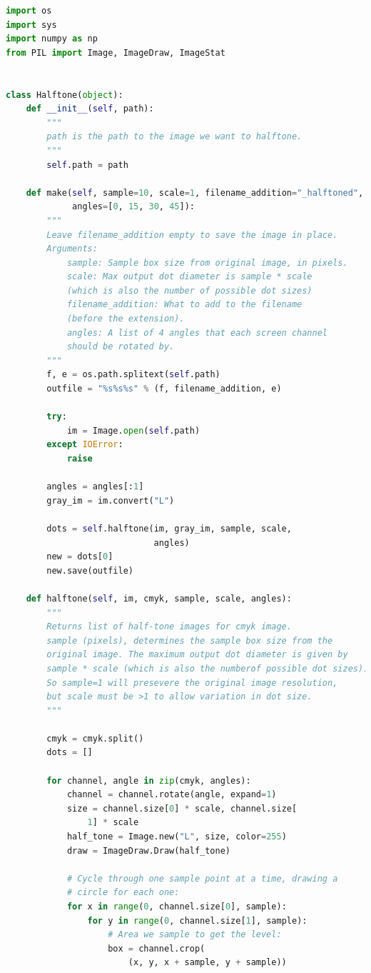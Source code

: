 \documentclass[%
]{USN-MSc}
\begin{document}
\begin{lstlisting}[language=Python, caption=Gray-scale Halftone., label={lst:Gray-scale Halftone}]
import os
import sys
import numpy as np
from PIL import Image, ImageDraw, ImageStat


class Halftone(object):
    def __init__(self, path):
        """
        path is the path to the image we want to halftone.
        """
        self.path = path

    def make(self, sample=10, scale=1, filename_addition="_halftoned",
             angles=[0, 15, 30, 45]):
        """
        Leave filename_addition empty to save the image in place.
        Arguments:
            sample: Sample box size from original image, in pixels.
            scale: Max output dot diameter is sample * scale 
            (which is also the number of possible dot sizes)
            filename_addition: What to add to the filename 
            (before the extension).
            angles: A list of 4 angles that each screen channel 
            should be rotated by.
        """
        f, e = os.path.splitext(self.path)
        outfile = "%s%s%s" % (f, filename_addition, e)

        try:
            im = Image.open(self.path)
        except IOError:
            raise

        angles = angles[:1]
        gray_im = im.convert("L")

        dots = self.halftone(im, gray_im, sample, scale,
                             angles)
        new = dots[0]
        new.save(outfile)

    def halftone(self, im, cmyk, sample, scale, angles):
        """
        Returns list of half-tone images for cmyk image. 
        sample (pixels), determines the sample box size from the 
        original image. The maximum output dot diameter is given by 
        sample * scale (which is also the numberof possible dot sizes). 
        So sample=1 will presevere the original image resolution, 
        but scale must be >1 to allow variation in dot size.
        """

        cmyk = cmyk.split()
        dots = []

        for channel, angle in zip(cmyk, angles):
            channel = channel.rotate(angle, expand=1)
            size = channel.size[0] * scale, channel.size[
                1] * scale
            half_tone = Image.new("L", size, color=255)
            draw = ImageDraw.Draw(half_tone)

            # Cycle through one sample point at a time, drawing a 
            # circle for each one:
            for x in range(0, channel.size[0], sample):
                for y in range(0, channel.size[1], sample):
                    # Area we sample to get the level:
                    box = channel.crop(
                        (x, y, x + sample, y + sample))


\end{lstlisting}
\end{document}
